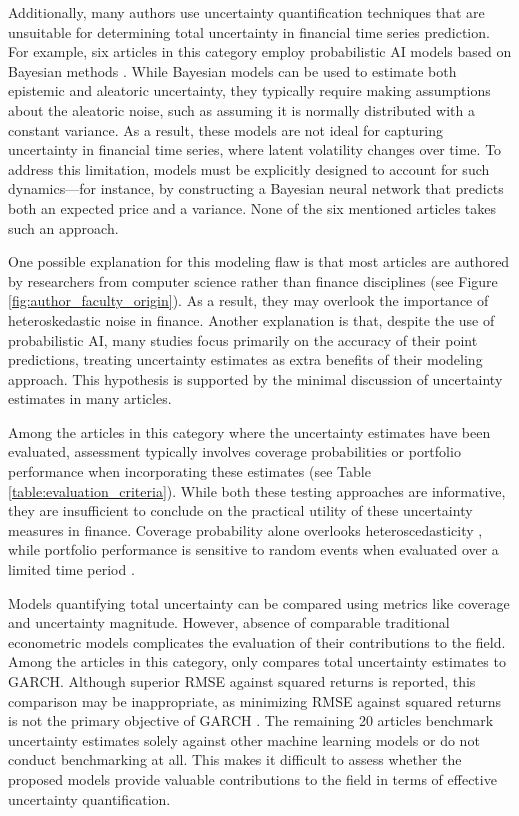 Additionally, many authors use uncertainty quantification techniques that are unsuitable for determining total uncertainty in financial time series prediction. For example, six articles in this category employ probabilistic AI models based on Bayesian methods \parencite{Law2017Practical,cocco2021predictions,Golnari2024Cryptocurrency,Dixon2022Industrial,chandra2021bayesian,magris2023bayesian}. While Bayesian models can be used to estimate both epistemic and aleatoric uncertainty, they typically require making assumptions about the aleatoric noise, such as assuming it is normally distributed with a constant variance. As a result, these models are not ideal for capturing uncertainty in financial time series, where latent volatility changes over time. To address this limitation, models must be explicitly designed to account for such dynamics—for instance, by constructing a Bayesian neural network that predicts both an expected price and a variance. None of the six mentioned articles takes such an approach.

One possible explanation for this modeling flaw is that most articles are authored by researchers from computer science rather than finance disciplines (see Figure \ref{fig:author_faculty_origin}). As a result, they may overlook the importance of heteroskedastic noise in finance. Another explanation is that, despite the use of probabilistic AI, many studies focus primarily on the accuracy of their point predictions, treating uncertainty estimates as extra benefits of their modeling approach. This hypothesis is supported by the minimal discussion of uncertainty estimates in many articles.

Among the articles in this category where the uncertainty estimates have been evaluated, assessment typically involves coverage probabilities or portfolio performance when incorporating these estimates (see Table \ref{table:evaluation_criteria}). While both these testing approaches are informative, they are insufficient to conclude on the practical utility of these uncertainty measures in finance. Coverage probability alone overlooks heteroscedasticity \parencite{Christoffersen1998}, while portfolio performance is sensitive to random events when evaluated over a limited time period \parencite{barras2010}.

Models quantifying total uncertainty can be compared using metrics like coverage and uncertainty magnitude. However, absence of comparable traditional econometric models complicates the evaluation of their contributions to the field. Among the \uqnondisting articles in this category, only \textcite{Platanios2014gpr} compares total uncertainty estimates to GARCH. Although superior RMSE against squared returns is reported, this comparison may be inappropriate, as minimizing RMSE against squared returns is not the primary objective of GARCH \parencite{BOLLERSLEV1986GARCH}. The remaining 20 articles benchmark uncertainty estimates solely against other machine learning models or do not conduct benchmarking at all. This makes it difficult to assess whether the proposed models provide valuable contributions to the field in terms of effective uncertainty quantification.

